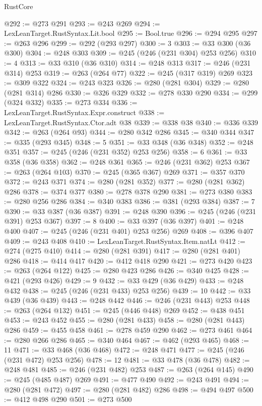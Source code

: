 \begin{lexlean}{RustCore}
\begin{coremodule}
@292 := @273 @291
@293 := @243 @269
@294 := LexLeanTarget.RustSyntax.Lit.bool
@295 := Bool.true
@296 := @294 @295
@297 := @263 @296
@299 := @292 (@293 @297)
@300 := 3
@303 := @33 @300 (@36 @300)
@304 := @248 @303
@309 := @245 (@246 (@231 @304) @253 @256)
@310 := 4
@313 := @33 @310 (@36 @310)
@314 := @248 @313
@317 := @246 (@231 @314) @253
@319 := @263 (@264 @77)
@322 := @245 (@317 @319) @269
@323 := @309 @322
@324 := @243 @323
@326 := @280 (@281 @304)
@329 := @280 (@281 @314) @286
@330 := @326 @329
@332 := @278 @330 @290
@334 := @299 (@324 @332)
@335 := @273 @334
@336 := LexLeanTarget.RustSyntax.Expr.construct
@338 := LexLeanTarget.RustSyntax.Ctor.adt @38
@339 := @338 @38
@340 := @336 @339
@342 := @263 (@264 @93)
@344 := @280 @342 @286
@345 := @340 @344
@347 := @335 (@293 @345)
@348 := 5
@351 := @33 @348 (@36 @348)
@352 := @248 @351
@357 := @245 (@246 (@231 @352) @253 @256)
@358 := 6
@361 := @33 @358 (@36 @358)
@362 := @248 @361
@365 := @246 (@231 @362) @253
@367 := @263 (@264 @103)
@370 := @245 (@365 @367) @269
@371 := @357 @370
@372 := @243 @371
@374 := @280 (@281 @352)
@377 := @280 (@281 @362) @286
@378 := @374 @377
@380 := @278 @378 @290
@381 := @273 @380
@383 := @280 @256 @286
@384 := @340 @383
@386 := @381 (@293 @384)
@387 := 7
@390 := @33 @387 (@36 @387)
@391 := @248 @390
@396 := @245 (@246 (@231 @391) @253 @367)
@397 := 8
@400 := @33 @397 (@36 @397)
@401 := @248 @400
@407 := @245 (@246 (@231 @401) @253 @256) @269
@408 := @396 @407
@409 := @243 @408
@410 := LexLeanTarget.RustSyntax.Item.natLt
@412 := @274 (@275 @410)
@414 := @280 (@281 @391)
@417 := @280 (@281 @401) @286
@418 := @414 @417
@420 := @412 @418 @290
@421 := @273 @420
@423 := @263 (@264 @122)
@425 := @280 @423 @286
@426 := @340 @425
@428 := @421 (@293 @426)
@429 := 9
@432 := @33 @429 (@36 @429)
@433 := @248 @432
@438 := @245 (@246 (@231 @433) @253 @256)
@439 := 10
@442 := @33 @439 (@36 @439)
@443 := @248 @442
@446 := @246 (@231 @443) @253
@448 := @263 (@264 @132)
@451 := @245 (@446 @448) @269
@452 := @438 @451
@453 := @243 @452
@455 := @280 (@281 @433)
@458 := @280 (@281 @443) @286
@459 := @455 @458
@461 := @278 @459 @290
@462 := @273 @461
@464 := @280 @266 @286
@465 := @340 @464
@467 := @462 (@293 @465)
@468 := 11
@471 := @33 @468 (@36 @468)
@472 := @248 @471
@477 := @245 (@246 (@231 @472) @253 @256)
@478 := 12
@481 := @33 @478 (@36 @478)
@482 := @248 @481
@485 := @246 (@231 @482) @253
@487 := @263 (@264 @145)
@490 := @245 (@485 @487) @269
@491 := @477 @490
@492 := @243 @491
@494 := @280 (@281 @472)
@497 := @280 (@281 @482) @286
@498 := @494 @497
@500 := @412 @498 @290
@501 := @273 @500

\end{coremodule}
\end{lexlean}
